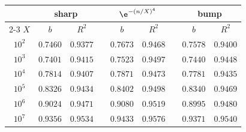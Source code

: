 \begin{tabular}{@{}c cc c cc c cc@{}}
\toprule
 & \multicolumn{2}{c}{sharp} & & \multicolumn{2}{c}{$\e^{-(n/X)^{4}}$} & & \multicolumn{2}{c}{bump}\\
\cmidrule{2-3}\cmidrule{5-6}\cmidrule{8-9}
$X$ & $b$ & $R^{2}$ & & $b$ & $R^{2}$ & & $b$ & $R^{2}$\\
\midrule
$10^{2}$ & $0.7460$ & $0.9377$ & & $0.7673$ & $0.9468$ & & $0.7578$ & $0.9400$\\
$10^{3}$ & $0.7401$ & $0.9415$ & & $0.7523$ & $0.9497$ & & $0.7440$ & $0.9448$\\
$10^{4}$ & $0.7814$ & $0.9407$ & & $0.7871$ & $0.9473$ & & $0.7781$ & $0.9435$\\
$10^{5}$ & $0.8326$ & $0.9434$ & & $0.8402$ & $0.9498$ & & $0.8340$ & $0.9469$\\
$10^{6}$ & $0.9024$ & $0.9471$ & & $0.9080$ & $0.9519$ & & $0.8995$ & $0.9480$\\
$10^{7}$ & $0.9356$ & $0.9534$ & & $0.9433$ & $0.9576$ & & $0.9371$ & $0.9540$\\
\bottomrule
\end{tabular}

